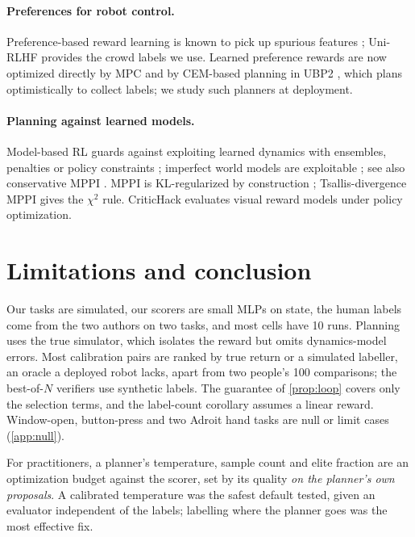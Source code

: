 \documentclass{article}
\theoremstyle{plain}
\theoremstyle{remark}
\begin{document}
\paragraph{Preferences for robot control.} Preference-based reward learning
\citep{christiano2017deep,sadigh2017active,lee2021pebble,hejna2023fewshot} is known to pick up spurious features
\citep{tien2023causal}; Uni-RLHF \citep{yuan2024unirlhf} provides the crowd labels we use. Learned preference rewards are
now optimized directly by MPC \citep{krupa2025learning,elhasnaouy2026active} and by CEM-based planning in UBP2
\citep{nabail2026ubp2}, which plans optimistically to collect labels; we study such planners at deployment.

\paragraph{Planning against learned models.} Model-based RL guards against exploiting learned dynamics with ensembles,
penalties \citep{chua2018pets,yu2020mopo,kidambi2020morel} or policy constraints
\citep{hansen2024tdmpc2,lin2025tdmpc2policy}; imperfect world models are exploitable \citep{bhamidipaty2026imperfect};
see also conservative MPPI \citep{yoon2026residual}. MPPI is KL-regularized by construction
\citep{williams2017information}; Tsallis-divergence MPPI \citep{wang2021tsallis} gives the $\chi^2$ rule. CriticHack
\citep{luo2026critichack} evaluates visual reward models under policy optimization.

\section{Limitations and conclusion}
\label{sec:conclusion}

Our tasks are simulated, our scorers are small MLPs on state, the human labels come from the two authors on
two tasks, and most cells have 10 runs. Planning uses the true simulator, which isolates the reward but omits
dynamics-model errors. Most calibration pairs are ranked by true return or a
simulated labeller, an oracle a deployed robot lacks, apart from two people's 100 comparisons; the best-of-$N$ verifiers
use synthetic labels. The guarantee of \cref{prop:loop} covers only the selection terms, and
the label-count corollary assumes a linear reward. Window-open, button-press and two Adroit hand tasks are null or limit cases
(\cref{app:null}).

For practitioners, a planner's temperature, sample count and elite fraction are an optimization budget against the
scorer, set by its quality \emph{on the planner's own proposals}. A calibrated temperature was the safest default
tested, given an evaluator independent of the labels; labelling where the planner goes was the most effective fix.
\end{document}
